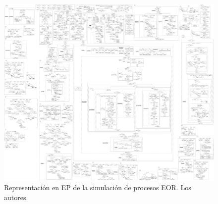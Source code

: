 \begin{figure}[h]
\centering%
\includegraphics[width=1\linewidth]{Fig/EPConQuimico.pdf}%
\caption[Representación en EP de la simulación de procesos EOR.]{Representación en EP de la simulación de procesos EOR. Los autores.} \label{fig:PSComplete}
\end{figure}

